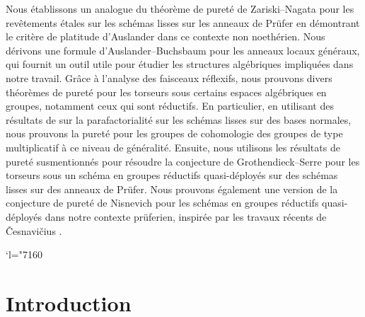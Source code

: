 \documentclass[JEP,XML,SOM,Unicode,published]{cedram}
\newcommand{\Changel}{\mathcode`l="7160}
\theoremstyle{plain}
\theoremstyle{definition}
\begin{document}


\begin{altabstract}
Nous établissons un analogue du théorème de pureté de Zariski--Nagata pour les revêtements étales sur les schémas lisses sur les anneaux de Prüfer en démontrant le critère de platitude d'Auslander dans ce contexte non noethérien. Nous dérivons une formule d'Auslander--Buchsbaum pour les anneaux locaux généraux, qui fournit un outil utile pour étudier les structures algébriques impliquées dans notre travail. Grâce à l'analyse des faisceaux réflexifs, nous prouvons divers théorèmes de pureté pour les torseurs sous certains espaces algébriques en groupes, notamment ceux qui sont réductifs. En particulier, en utilisant des résultats de \cite{EGAIV4} sur la parafactorialité sur les schémas lisses sur des bases normales, nous prouvons la pureté pour les groupes de cohomologie des groupes de type multiplicatif à ce niveau de généralité. Ensuite, nous utilisons les résultats de pureté susmentionnés pour résoudre la conjecture de Grothendieck--Serre pour les torseurs sous un schéma en groupes réductifs quasi-déployés sur des schémas lisses sur des anneaux de Prüfer. Nous prouvons également une version de la conjecture de pureté de Nisnevich pour les schémas en groupes réductifs quasi-déployés dans notre contexte prüferien, inspirée par les travaux récents de \v{C}esnavi\v{c}ius \cite{Ces22b}.
\end{altabstract}

\maketitle
\tableofcontents
\mainmatter

\Changel

\section{{Introduction}}
\end{document}
